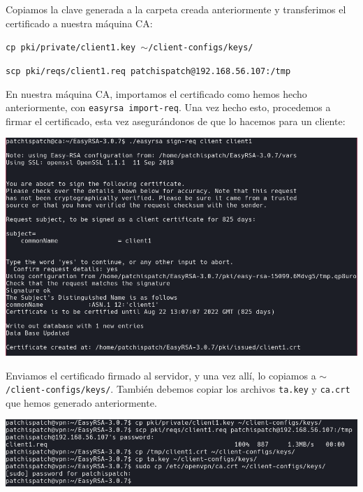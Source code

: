 \documentclass[11pt,a4paper]{article}
\begin{document}
\medskip

Copiamos la clave generada a la carpeta creada anteriormente y transferimos el certificado a nuestra máquina CA:

\medskip

\texttt{cp pki/private/client1.key $\sim$/client-configs/keys/}

\texttt{scp pki/reqs/client1.req patchispatch@192.168.56.107:/tmp}

\medskip

En nuestra máquina CA, importamos el certificado como hemos hecho anteriormente, con \texttt{easyrsa import-req}. Una vez hecho esto, procedemos a firmar el certificado, esta vez asegurándonos de que lo hacemos para un cliente:

\medskip

\begin{center}
\includegraphics[scale=0.4]{sign-client1.png}
\end{center}

\medskip

Enviamos el certificado firmado al servidor, y una vez allí, lo copiamos a \texttt{$\sim$/client-configs/keys/}. También debemos copiar los archivos \texttt{ta.key} y \texttt{ca.crt} que hemos generado anteriormente.

\medskip

\begin{center}
\includegraphics[scale=0.4]{cp-client1.png}
\end{center}
\end{document}
